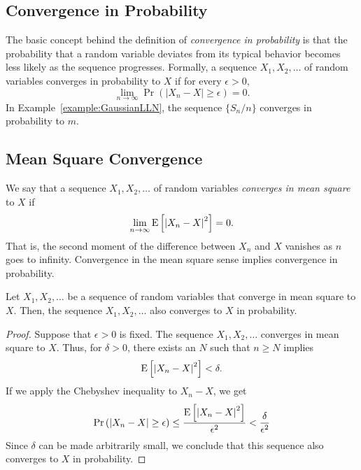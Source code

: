 \subsection{Convergence in Probability}

The basic concept behind the definition of \emph{convergence in probability} is that the probability that a random variable deviates from its typical behavior becomes less likely as the sequence progresses. 
Formally, a sequence $X_1, X_2, \ldots$ of random variables converges in probability to $X$ if for every $\epsilon > 0$,
\begin{equation*}
\lim_{n \rightarrow \infty} \Pr \left( \left| X_n - X \right| \geq \epsilon \right) = 0 .
\end{equation*}
In Example~\ref{example:GaussianLLN}, the sequence $\{ S_n / n \}$ converges in probability to $m$.


\subsection{Mean Square Convergence}

We say that a sequence $X_1, X_2, \ldots$ of random variables \emph{converges in mean square} to $X$ if 
\begin{equation*}
\lim_{n \rightarrow \infty} \mathrm{E} \left[ \left| X_n - X \right|^2 \right] = 0 .
\end{equation*}
That is, the second moment of the difference between $X_n$ and $X$ vanishes as $n$ goes to infinity.
Convergence in the mean square sense implies convergence in probability.

\begin{proposition} \label{proposition:ConvergenceImplication1}
Let $X_1, X_2, \ldots$ be a sequence of random variables that converge in mean square to $X$.
Then, the sequence $X_1, X_2, \ldots$ also converges to $X$ in probability.
\end{proposition}
\begin{proof}
Suppose that $\epsilon > 0$ is fixed.
The sequence $X_1, X_2, \ldots$ converges in mean square to $X$.
Thus, for $\delta > 0$, there exists an $N$ such that $n \geq N$ implies
\begin{equation*}
\mathrm{E} \left[ \left| X_n - X \right|^2 \right] < \delta .
\end{equation*}
If we apply the Chebyshev inequality to $X_n - X$, we get
\begin{equation*}
\Pr \left( \left| X_n - X \right| \geq \epsilon \right)
\leq \frac{ \mathrm{E} \left[ \left| X_n - X \right|^2 \right] }{ \epsilon^2 }
< \frac{ \delta }{ \epsilon^2 }
\end{equation*}
Since $\delta$ can be made arbitrarily small, we conclude that this sequence also converges to $X$ in probability.
\end{proof}


